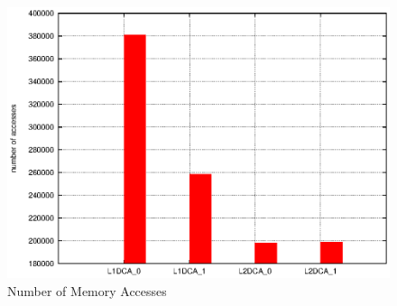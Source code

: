 \documentclass[a4paper,10pt,openright,openbib,twocolumn]{article}
\begin{document}
\begin{figure}[!htp]
	\centering
	\begin{minipage}[t]{\linewidth}
		\includegraphics[width=\linewidth]{images/totals.eps}
		\caption{Number of Memory Accesses }
	\end{minipage}
\end{figure}
\end{document}
